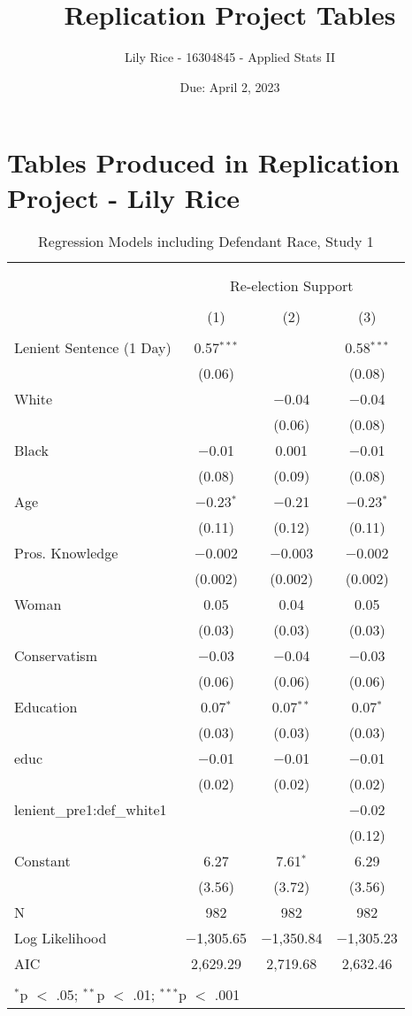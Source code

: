 \documentclass[12pt,letterpaper]{article}
\title{Replication Project Tables}
\date{Due: April 2, 2023}
\author{Lily Rice - 16304845 - Applied Stats II}
\begin{document}
	\maketitle
	\section*{Tables Produced in Replication Project - Lily Rice}

\begin{table}[!htbp] \centering   \caption{Regression Models including Defendant Race, Study 1}   \label{} \begin{tabular}{@{\extracolsep{5pt}}lccc} \\[-1.8ex]\hline \\[-1.8ex] \\[-1.8ex] & \multicolumn{3}{c}{Re-election Support} \\ \\[-1.8ex] & (1) & (2) & (3)\\ \hline \\[-1.8ex]  Lenient Sentence (1 Day) & 0.57$^{***}$ &  & 0.58$^{***}$ \\   & (0.06) &  & (0.08) \\   White &  & $-$0.04 & $-$0.04 \\   &  & (0.06) & (0.08) \\   Black & $-$0.01 & 0.001 & $-$0.01 \\   & (0.08) & (0.09) & (0.08) \\   Age & $-$0.23$^{*}$ & $-$0.21 & $-$0.23$^{*}$ \\   & (0.11) & (0.12) & (0.11) \\   Pros. Knowledge & $-$0.002 & $-$0.003 & $-$0.002 \\   & (0.002) & (0.002) & (0.002) \\   Woman & 0.05 & 0.04 & 0.05 \\   & (0.03) & (0.03) & (0.03) \\   Conservatism & $-$0.03 & $-$0.04 & $-$0.03 \\   & (0.06) & (0.06) & (0.06) \\   Education & 0.07$^{*}$ & 0.07$^{**}$ & 0.07$^{*}$ \\   & (0.03) & (0.03) & (0.03) \\   educ & $-$0.01 & $-$0.01 & $-$0.01 \\   & (0.02) & (0.02) & (0.02) \\   lenient\_pre1:def\_white1 &  &  & $-$0.02 \\   &  &  & (0.12) \\   Constant & 6.27 & 7.61$^{*}$ & 6.29 \\   & (3.56) & (3.72) & (3.56) \\  N & 982 & 982 & 982 \\ Log Likelihood & $-$1,305.65 & $-$1,350.84 & $-$1,305.23 \\ AIC & 2,629.29 & 2,719.68 & 2,632.46 \\ \hline \\[-1.8ex] \multicolumn{4}{l}{$^{*}$p $<$ .05; $^{**}$p $<$ .01; $^{***}$p $<$ .001} \\ \end{tabular} \end{table} 
\end{document}
